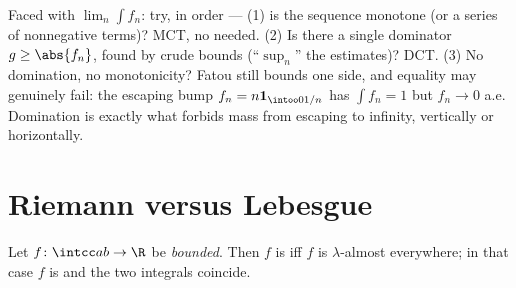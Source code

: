 \begin{method}\label{met:b3:lebesgue:convergence}
Faced with $\lim_n\int f_n$: try, in order --- (1) is the
sequence monotone (or a series of nonnegative terms)? MCT, no
 needed. (2) Is there a single 
dominator $g \geq \abs{f_n}$, found by crude bounds
(``$\sup_n$'' the estimates)? DCT. (3) No domination, no
monotonicity? Fatou still bounds one side, and equality may
genuinely fail: the escaping bump $f_n = n\mathbf
1_{\intoo0{1/n}}$ has $\int f_n = 1$ but $f_n \to 0$ a.e.
Domination is exactly what forbids mass from escaping to
infinity, vertically or horizontally.
\end{method}

\section{Riemann versus Lebesgue}

\begin{theorem}
\label{thm:b3:lebesgue:riemann}
Let $f \colon \intcc ab \to \R$ be \emph{bounded}. Then $f$ is
 iff $f$ is  $\lambda$-almost
everywhere; in that case $f$ is  and the two
integrals coincide.
\end{theorem}

